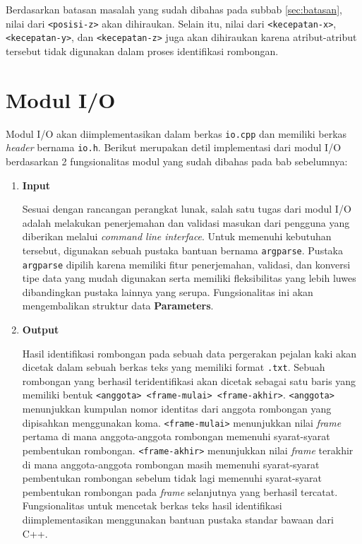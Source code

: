 Berdasarkan batasan masalah yang sudah dibahas pada subbab \ref{sec:batasan}, nilai dari \texttt{<posisi-z>} akan dihiraukan. Selain itu, nilai dari \texttt{<kecepatan-x>}, \texttt{<kecepatan-y>}, dan \texttt{<kecepatan-z>} juga akan dihiraukan karena atribut-atribut tersebut tidak digunakan dalam proses identifikasi rombongan.

\section{Modul I/O}
\label{sec:impl-io}

Modul I/O akan diimplementasikan dalam berkas \texttt{io.cpp} dan memiliki berkas \textit{header} bernama \texttt{io.h}. Berikut merupakan detil implementasi dari modul I/O berdasarkan 2 fungsionalitas modul yang sudah dibahas pada bab sebelumnya:

\begin{enumerate}
    \item \textbf{Input}
    
    Sesuai dengan rancangan perangkat lunak, salah satu tugas dari modul I/O adalah melakukan penerjemahan dan validasi masukan dari pengguna yang diberikan melalui \textit{command line interface}. Untuk memenuhi kebutuhan tersebut, digunakan sebuah pustaka bantuan bernama \texttt{argparse}. Pustaka \texttt{argparse} dipilih karena memiliki fitur penerjemahan, validasi, dan konversi tipe data yang mudah digunakan serta memiliki fleksibilitas yang lebih luwes dibandingkan pustaka lainnya yang serupa. Fungsionalitas ini akan mengembalikan struktur data \textbf{Parameters}.
    
    \item \textbf{Output}
    
    Hasil identifikasi rombongan pada sebuah data pergerakan pejalan kaki akan dicetak dalam sebuah berkas teks yang memiliki format \texttt{.txt}. Sebuah rombongan yang berhasil teridentifikasi akan dicetak sebagai satu baris yang memiliki bentuk \texttt{<anggota> <frame-mulai> <frame-akhir>}. \texttt{<anggota>} menunjukkan kumpulan nomor identitas dari anggota rombongan yang dipisahkan menggunakan koma. \texttt{<frame-mulai>} menunjukkan nilai \textit{frame} pertama di mana anggota-anggota rombongan memenuhi syarat-syarat pembentukan rombongan. \texttt{<frame-akhir>} menunjukkan nilai \textit{frame} terakhir di mana anggota-anggota rombongan masih memenuhi syarat-syarat pembentukan rombongan sebelum tidak lagi memenuhi syarat-syarat pembentukan rombongan pada \textit{frame} selanjutnya yang berhasil tercatat. Fungsionalitas untuk mencetak berkas teks hasil identifikasi diimplementasikan menggunakan bantuan pustaka standar bawaan dari C++.
\end{enumerate}

